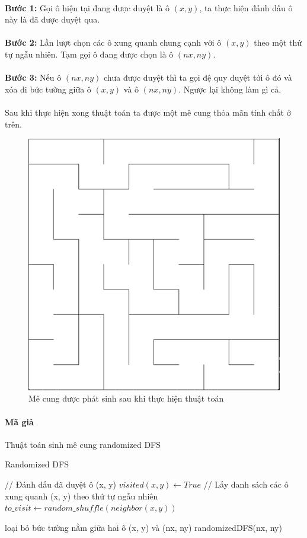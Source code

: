\paragraph{}{\textbf{Bước 1:} Gọi ô hiện tại đang được duyệt là ô $(x, y)$, ta thực hiện đánh dấu ô này là đã được duyệt qua.}
\paragraph{}{\textbf{Bước 2:} Lần lượt chọn các ô xung quanh chung cạnh với ô $(x, y)$ theo một thứ tự ngẫu nhiên. Tạm gọi ô đang được chọn là ô $(nx, ny)$.}
\paragraph{}{\textbf{Bước 3:} Nếu ô $(nx, ny)$ chưa được duyệt thì ta gọi đệ quy duyệt tới ô đó và xóa đi bức tường giữa ô $(x, y)$ và ô $(nx, ny)$. Ngược lại không làm gì cả.}


\paragraph{}{Sau khi thực hiện xong thuật toán ta được một mê cung thỏa mãn tính chất ở trên.}

\begin{figure}[H]
    \centering
    \includegraphics[width=0.3\linewidth]{img/init-maze-2.png}
    \caption{Mê cung được phát sinh sau khi thực hiện thuật toán}
    \label{fig:init-maze-2}
\end{figure}

\paragraph{Mã giả}{Thuật toán sinh mê cung randomized DFS}

\begin{algorithm}[H]
\caption{Randomized DFS}
\label{alg:rdfs}
\begin{algorithmic}
\State // Đánh dấu đã duyệt ô (x, y)
\State $visited(x, y) \gets True$ 
\State
\State // Lấy danh sách các ô xung quanh (x, y) theo thứ tự ngẫu nhiên
\State $to\_visit \gets random\_shuffle(neighbor(x, y))$ 
\State

\State loại bỏ bức tường nằm giữa hai ô (x, y) và (nx, ny)
\State randomizedDFS(nx, ny)
\EndIf
\EndFor
\EndFunction

\end{algorithmic}
\end{algorithm}

